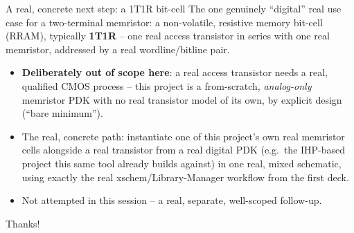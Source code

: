 \documentclass[aspectratio=169]{beamer}
\begin{document}
\begin{frame}{A real, concrete next step: a 1T1R bit-cell}
The one genuinely ``digital'' real use case for a two-terminal
memristor: a non-volatile, resistive memory bit-cell (RRAM),
typically \textbf{1T1R} -- one real access transistor in series with
one real memristor, addressed by a real wordline/bitline pair.
\begin{itemize}
  \item \textbf{Deliberately out of scope here}: a real access
        transistor needs a real, qualified CMOS process -- this
        project is a from-scratch, \emph{analog-only} memristor PDK
        with no real transistor model of its own, by explicit design
        (``bare minimum'').
  \item The real, concrete path: instantiate one of this project's
        own real memristor cells alongside a real transistor from a
        real digital PDK (e.g.\ the IHP-based project this same tool
        already builds against) in one real, mixed schematic, using
        exactly the real xschem/Library-Manager workflow from the
        first deck.
  \item Not attempted in this session -- a real, separate, well-scoped
        follow-up.
\end{itemize}
\end{frame}

\begin{frame}
\centering\Large Thanks!
\end{frame}
\end{document}
